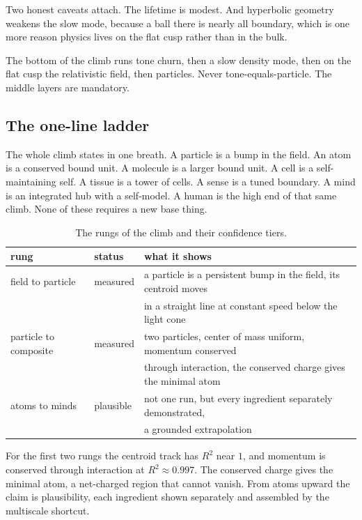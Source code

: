 Two honest caveats attach. The lifetime is modest. And hyperbolic geometry weakens the slow mode, because a ball there is nearly all boundary, which is one more reason physics lives on the flat cusp rather than in the bulk.

\begin{result}
The bottom of the climb runs tone churn, then a slow density mode, then on the flat cusp the relativistic field, then particles. Never tone-equals-particle. The middle layers are mandatory.
\end{result}

\subsection{The one-line ladder}

The whole climb states in one breath. A particle is a bump in the field. An atom is a conserved bound unit. A molecule is a larger bound unit. A cell is a self-maintaining self. A tissue is a tower of cells. A sense is a tuned boundary. A mind is an integrated hub with a self-model. A human is the high end of that same climb. None of these requires a new base thing.

\begin{table}[ht]
\centering
\begin{tabular}{@{}lll@{}}
\toprule
rung & status & what it shows \\
\midrule
field to particle & measured & a particle is a persistent bump in the field, its centroid moves \\
 & & in a straight line at constant speed below the light cone \\
particle to composite & measured & two particles, center of mass uniform, momentum conserved \\
 & & through interaction, the conserved charge gives the minimal atom \\
atoms to minds & plausible & not one run, but every ingredient separately demonstrated, \\
 & & a grounded extrapolation \\
\bottomrule
\end{tabular}
\caption{The rungs of the climb and their confidence tiers.}
\label{tab:climb-rungs}
\end{table}

For the first two rungs the centroid track has $R^2$ near $1$, and momentum is conserved through interaction at $R^2 \approx 0.997$. The conserved charge gives the minimal atom, a net-charged region that cannot vanish. From atoms upward the claim is plausibility, each ingredient shown separately and assembled by the multiscale shortcut.

